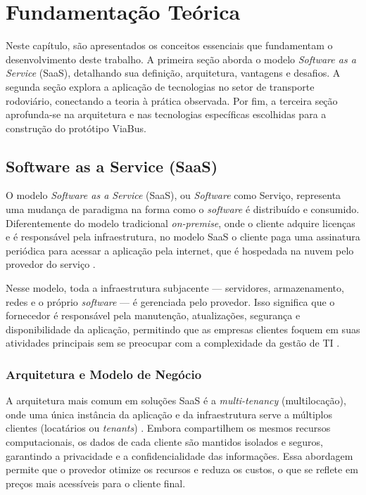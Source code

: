 \chapter{Fundamentação Teórica}\label{cha:fundamentacao_teorica}

Neste capítulo, são apresentados os conceitos essenciais que fundamentam o desenvolvimento deste trabalho. A primeira seção aborda o modelo \textit{Software as a Service} (SaaS), detalhando sua definição, arquitetura, vantagens e desafios. A segunda seção explora a aplicação de tecnologias no setor de transporte rodoviário, conectando a teoria à prática observada. Por fim, a terceira seção aprofunda-se na arquitetura e nas tecnologias específicas escolhidas para a construção do protótipo ViaBus.

\section{Software as a Service (SaaS)}

O modelo \textit{Software as a Service} (SaaS), ou \textit{Software} como Serviço, representa uma mudança de paradigma na forma como o \textit{software} é distribuído e consumido. Diferentemente do modelo tradicional \textit{on-premise}, onde o cliente adquire licenças e é responsável pela infraestrutura, no modelo SaaS o cliente paga uma assinatura periódica para acessar a aplicação pela internet, que é hospedada na nuvem pelo provedor do serviço \cite{moveideias2025saas}.

Nesse modelo, toda a infraestrutura subjacente — servidores, armazenamento, redes e o próprio \textit{software} — é gerenciada pelo provedor. Isso significa que o fornecedor é responsável pela manutenção, atualizações, segurança e disponibilidade da aplicação, permitindo que as empresas clientes foquem em suas atividades principais sem se preocupar com a complexidade da gestão de TI \cite{moveideias2025saas}.

\subsection{Arquitetura e Modelo de Negócio}

A arquitetura mais comum em soluções SaaS é a \textit{multi-tenancy} (multilocação), onde uma única instância da aplicação e da infraestrutura serve a múltiplos clientes (locatários ou \textit{tenants}) \cite{frontegg2021multitenant}. Embora compartilhem os mesmos recursos computacionais, os dados de cada cliente são mantidos isolados e seguros, garantindo a privacidade e a confidencialidade das informações. Essa abordagem permite que o provedor otimize os recursos e reduza os custos, o que se reflete em preços mais acessíveis para o cliente final.

